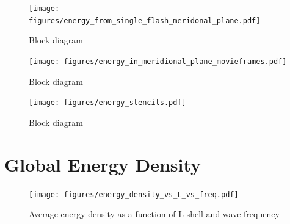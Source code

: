 \begin{figure}
\begin{center}
\texttt{[image: figures/energy\_from\_single\_flash\_meridonal\_plane.pdf]}
\caption{Block diagram}
\label{fig:energy_from_single_flash}
\end{center}
\end{figure}


\begin{figure}
\begin{center}
\texttt{[image: figures/energy\_in\_meridional\_plane\_movieframes.pdf]}
\caption{Block diagram}
\label{fig:energy_from_single_flash}
\end{center}
\end{figure}


\begin{figure}[ht]
\begin{center}
\texttt{[image: figures/energy\_stencils.pdf]}
\caption{Block diagram}
\label{fig:energy_stencils}
\end{center}
\end{figure}

\section{Global Energy Density}

\begin{figure}
\begin{center}
\texttt{[image: figures/energy\_density\_vs\_L\_vs\_freq.pdf]}
\caption[Average energy density vs L and frequency]{Average energy density as a function of L-shell and wave frequency}
\label{fig:energy_density_vs_L_vs_freq}
\end{center}
\end{figure}

